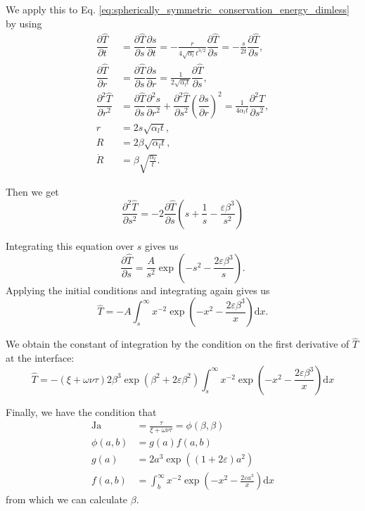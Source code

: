 \documentclass{article}
\numberwithin{equation}{section}
\newcommand{\dd}{\mathrm{d}}
\newcommand{\pd}[2]{\dfrac{\partial #1}{\partial #2}}
\newcommand{\pdd}[2]{\dfrac{\partial^2 #1}{\partial #2^2}}
\newcommand{\dimless}[1]{\hat{#1}}
\begin{document}
We apply this to Eq. \eqref{eq:spherically_symmetric_conservation_energy_dimless} by using
\begin{align}
    \pd{\dimless{T}}{t}
    &= \pd{\dimless{T}}{s} \pd{s}{t}
    = -\frac{r}{4 \sqrt{\alpha_l} t^{3/2}} \pd{\dimless{T}}{s}
    = -\frac{s}{2 t} \pd{\dimless{T}}{s}, \\
    \pd{\dimless{T}}{r}
    &= \pd{\dimless{T}}{s} \pd{s}{r}
    = \frac{1}{2 \sqrt{\alpha_l t}} \pd{\dimless{T}}{s}, \\
    \pdd{\dimless{T}}{r}
    &= \pd{\dimless{T}}{s} \pdd{s}{r} + \pdd{\dimless{T}}{s} \left(\pd{s}{r}\right)^2
    = \frac{1}{4 \alpha_l t} \pdd{\dimless{T}}{s}, \\
    r &= 2s \sqrt{\alpha_l t}, \\
    R &= 2 \beta \sqrt{\alpha_l t}, \\
    \dot{R} &= \beta \sqrt{\frac{\alpha_l}{t}}.
\end{align}

Then we get
\begin{equation}
    \pdd{\dimless{T}}{s}
    = -2 \pd{\dimless{T}}{s} \left(
        s
        + \frac{1}{s}
        - \frac{\varepsilon \beta^3}{s^2}
    \right)
\end{equation}

Integrating this equation over $s$ gives us
\begin{equation}
    \pd{\dimless{T}}{s} =
    \frac{A}{s^2} \exp\left(-s^2 - \frac{2 \varepsilon \beta^3}{s}\right).
\end{equation}
Applying the initial conditions and integrating again gives us
\begin{equation}
    \dimless{T} =
    -A \int_s^\infty
        x^{-2}
        \exp\left(-x^2 - \frac{2 \varepsilon \beta^3}{x}\right)
    \dd x.
\end{equation}

We obtain the constant of integration by the condition on the first derivative of $\dimless{T}$ at the interface:
\begin{equation}
    \dimless{T} =
    -(\xi + \omega \nu \tau) 2 \beta^3 \exp\left(\beta^2 + 2\varepsilon\beta^2\right)
    \int_s^\infty
        x^{-2}
        \exp\left(-x^2 - \frac{2 \varepsilon \beta^3}{x}\right)
    \dd x
\end{equation}

Finally, we have the condition that
\begin{equation}
    \begin{split}
        \text{Ja} &= \frac{\tau}{\xi + \omega \nu \tau} = \phi(\beta, \beta) \\
        \phi(a, b) &= g(a) f(a, b) \\
        g(a) &= 2 a^3 \exp\left((1+2\varepsilon) a^2\right) \\
        f(a, b) &= \int_b^\infty
            x^{-2}
            \exp\left(-x^2 - \frac{2 \varepsilon a^3}{x}\right)
        \dd x
    \end{split}
\end{equation}
from which we can calculate $\beta$.
\end{document}
